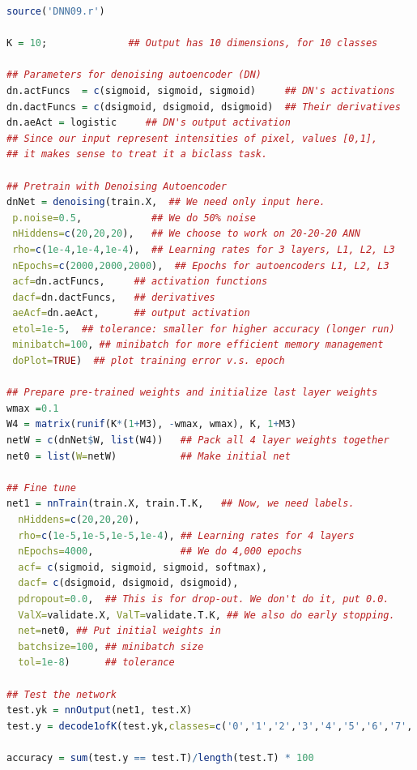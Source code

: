 \begin{lstlisting}[language=R,caption={เตรียมการฝึก, ฝึก, และ ทดสอบ โครงข่ายประสาทเทียม 4 ชั้น},
label={lst: deep run}]
source('DNN09.r') 

K = 10;              ## Output has 10 dimensions, for 10 classes

## Parameters for denoising autoencoder (DN)
dn.actFuncs  = c(sigmoid, sigmoid, sigmoid)     ## DN's activations
dn.dactFuncs = c(dsigmoid, dsigmoid, dsigmoid)  ## Their derivatives
dn.aeAct = logistic     ## DN's output activation
## Since our input represent intensities of pixel, values [0,1], 
## it makes sense to treat it a biclass task.

## Pretrain with Denoising Autoencoder
dnNet = denoising(train.X,  ## We need only input here. 
 p.noise=0.5,            ## We do 50% noise
 nHiddens=c(20,20,20),   ## We choose to work on 20-20-20 ANN
 rho=c(1e-4,1e-4,1e-4),  ## Learning rates for 3 layers, L1, L2, L3
 nEpochs=c(2000,2000,2000),  ## Epochs for autoencoders L1, L2, L3
 acf=dn.actFuncs,     ## activation functions
 dacf=dn.dactFuncs,   ## derivatives
 aeAcf=dn.aeAct,      ## output activation
 etol=1e-5,  ## tolerance: smaller for higher accuracy (longer run)
 minibatch=100, ## minibatch for more efficient memory management
 doPlot=TRUE)  ## plot training error v.s. epoch

## Prepare pre-trained weights and initialize last layer weights
wmax =0.1
W4 = matrix(runif(K*(1+M3), -wmax, wmax), K, 1+M3)
netW = c(dnNet$W, list(W4))   ## Pack all 4 layer weights together
net0 = list(W=netW)           ## Make initial net

## Fine tune
net1 = nnTrain(train.X, train.T.K,   ## Now, we need labels.
  nHiddens=c(20,20,20),
  rho=c(1e-5,1e-5,1e-5,1e-4), ## Learning rates for 4 layers
  nEpochs=4000,               ## We do 4,000 epochs
  acf= c(sigmoid, sigmoid, sigmoid, softmax), 
  dacf= c(dsigmoid, dsigmoid, dsigmoid),
  pdropout=0.0,  ## This is for drop-out. We don't do it, put 0.0.
  ValX=validate.X, ValT=validate.T.K, ## We also do early stopping.
  net=net0, ## Put initial weights in
  batchsize=100, ## minibatch size
  tol=1e-8)      ## tolerance

## Test the network  
test.yk = nnOutput(net1, test.X)
test.y = decode1ofK(test.yk,classes=c('0','1','2','3','4','5','6','7','8','9'))

accuracy = sum(test.y == test.T)/length(test.T) * 100 
\end{lstlisting}

